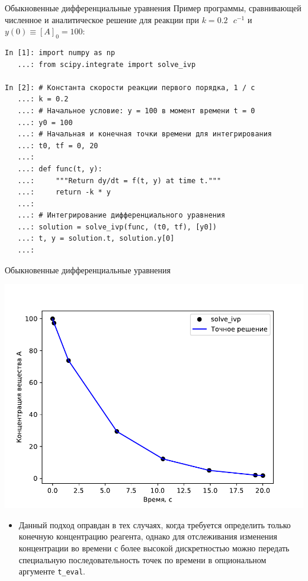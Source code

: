 \documentclass[aspectratio=169, mathserif]{beamer}	%
\begin{document}
\begin{frame}[fragile]{Обыкновенные дифференциальные уравнения}
\scriptsize
Пример программы, сравнивающей численное и аналитическое решение для реакции при $k = 0.2 \text{ } c^{-1}$ и $y(0) \equiv \left[A\right]_0 = 100$:

\begin{lstlisting}[language=iPython, numbers=none, frame=none]
In [1]: import numpy as np
   ...: from scipy.integrate import solve_ivp

In [2]: # Константа скорости реакции первого порядка, 1 / с
   ...: k = 0.2
   ...: # Начальное условие: y = 100 в момент времени t = 0
   ...: y0 = 100
   ...: # Начальная и конечная точки времени для интегрирования
   ...: t0, tf = 0, 20
   ...:
   ...: def func(t, y):
   ...:     """Return dy/dt = f(t, y) at time t."""
   ...:     return -k * y
   ...:
   ...: # Интегрирование дифференциального уравнения
   ...: solution = solve_ivp(func, (t0, tf), [y0])
   ...: t, y = solution.t, solution.y[0]
   ...:
\end{lstlisting}
\vfil
\end{frame}

\begin{frame}[fragile]{Обыкновенные дифференциальные уравнения}
\scriptsize
\begin{minipage}{.48\linewidth}
	\centering
	\includegraphics[width=.95\linewidth]{./pics/Figure_34}
\end{minipage}
\begin{minipage}{.5\linewidth}
	\begin{itemize}
		\item Данный подход оправдан в тех случаях, когда требуется определить только конечную концентрацию реагента, однако для отслеживания изменения концентрации во времени с более высокой дискретностью можно передать специальную последовательность точек по времени в опциональном аргументе \texttt{t\_eval}.
	\end{itemize}
\end{minipage}
\vfill
\end{frame}
\end{document}
